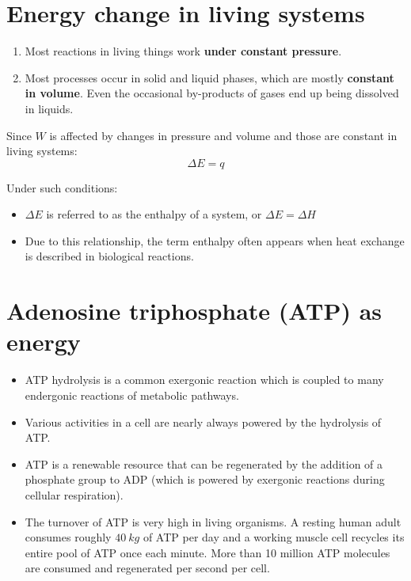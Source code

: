 \documentclass[11pt]{article}
\begin{document}
\newpage

\section{Energy change in living systems}
\label{sec:orgc6fcc3b}
\begin{enumerate}
\item Most reactions in living things work \textbf{under constant pressure}.
\item Most processes occur in solid and liquid phases, which are mostly \textbf{constant in volume}. Even the occasional by-products of gases end up being dissolved in liquids.
\end{enumerate}

Since \(W\) is affected by changes in pressure and volume and those are constant in living systems:
\[\Delta E = q\]

Under such conditions:
\begin{itemize}
\item \(\Delta E\) is referred to as the enthalpy of a system, or \(\Delta E = \Delta H\)
\item Due to this relationship, the term enthalpy often appears when heat exchange is described in biological reactions.
\end{itemize}


\section{Adenosine triphosphate (ATP) as energy}
\label{sec:orgb5fa0e9}
\begin{itemize}
\item ATP hydrolysis is a common exergonic reaction which is coupled to many endergonic reactions of metabolic pathways.
\item Various activities in a cell are nearly always powered by the hydrolysis of ATP.
\item ATP is a renewable resource that can be regenerated by the addition of a phosphate group to ADP (which is powered by exergonic reactions during cellular respiration).
\item The turnover of ATP is very high in living organisms. A resting human adult consumes roughly \(\qty{40}{\unit{kg}}\) of ATP per day and a working muscle cell recycles its entire pool of ATP once each minute. More than 10 million ATP molecules are consumed and regenerated per second per cell.
\end{itemize}
\end{document}
